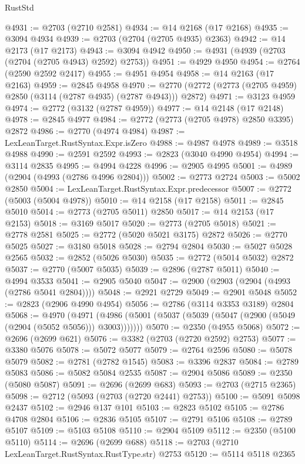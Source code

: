 \begin{lexlean}{RustStd}
\begin{coremodule}
@4931 := @2703 (@2710 @2581)
@4934 := @14 @2168 (@17 @2168)
@4935 := @3094 @4934
@4939 := @2703 (@2704 (@2705 @4935) @2363)
@4942 := @14 @2173 (@17 @2173)
@4943 := @3094 @4942
@4950 := @4931 (@4939 (@2703 (@2704 (@2705 @4943) @2592) @2753))
@4951 := @4929 @4950
@4954 := @2764 (@2590 @2592 @2417)
@4955 := @4951 @4954
@4958 := @14 @2163 (@17 @2163)
@4959 := @2845 @4958
@4970 := @2770 (@2772 (@2773 (@2705 @4959) @2850 (@3114 (@2787 @4935) (@2787 @4943))) @2872)
@4971 := @3123 @4959
@4974 := @2772 (@3132 (@2787 @4959))
@4977 := @14 @2148 (@17 @2148)
@4978 := @2845 @4977
@4984 := @2772 (@2773 (@2705 @4978) @2850 @3395) @2872
@4986 := @2770 (@4974 @4984)
@4987 := LexLeanTarget.RustSyntax.Expr.isZero
@4988 := @4987 @4978
@4989 := @3518 @4988
@4990 := @2591 @2592
@4993 := @2823 (@3040 @4990 @4954)
@4994 := @3114 @2835
@4995 := @4994 @4228
@4996 := @2905 @4995
@5001 := @4989 (@2904 (@4993 (@2786 @4996 @2804)))
@5002 := @2773 @2724
@5003 := @5002 @2850
@5004 := LexLeanTarget.RustSyntax.Expr.predecessor
@5007 := @2772 (@5003 (@5004 @4978))
@5010 := @14 @2158 (@17 @2158)
@5011 := @2845 @5010
@5014 := @2773 (@2705 @5011) @2850
@5017 := @14 @2153 (@17 @2153)
@5018 := @3169 @5017
@5020 := @2773 (@2705 @5018)
@5021 := @2778 @2581
@5025 := @2772 (@5020 @5021 @3175) @2872
@5026 := @2770 @5025
@5027 := @3180 @5018
@5028 := @2794 @2804
@5030 := @5027 @5028 @2565
@5032 := @2852 (@5026 @5030)
@5035 := @2772 (@5014 @5032) @2872
@5037 := @2770 (@5007 @5035)
@5039 := @2896 (@2787 @5011)
@5040 := @4994 @3533
@5041 := @2905 @5040
@5047 := @2900 (@2903 (@2904 (@4993 (@2786 @5041 @2804))))
@5048 := @2921 @2729
@5049 := @2901 @5048
@5052 := @2823 (@2906 @4990 @4954)
@5056 := @2786 (@3114 @3353 @3189) @2804
@5068 := @4970
    (@4971 (@4986 (@5001 (@5037 (@5039 (@5047 (@2900 (@5049 (@2904 (@5052 @5056))) @3003)))))))
@5070 := @2350 (@4955 @5068)
@5072 := @2696 (@2699 @621)
@5076 := @3382 (@2703 (@2720 @2592) @2753)
@5077 := @3380 @5076
@5078 := @5072 @5077
@5079 := @2764 @2596
@5080 := @5078 @5079
@5082 := @2781 (@2782 @1545)
@5083 := @3396 @2837
@5084 := @2789 @5083
@5086 := @5082 @5084 @2535
@5087 := @2904 @5086
@5089 := @2350 (@5080 @5087)
@5091 := @2696 (@2699 @683)
@5093 := @2703 (@2715 @2365)
@5098 := @2712 (@5093 (@2703 (@2720 @2441) @2753))
@5100 := @5091 @5098 @2437
@5102 := @2946 @137 @101
@5103 := @2823 @5102
@5105 := @2786 @4708 @2804
@5106 := @2836 @5105
@5107 := @2791 @5106
@5108 := @2789 @5107
@5109 := @5103 @5108
@5110 := @2904 @5109
@5112 := @2350 (@5100 @5110)
@5114 := @2696 (@2699 @688)
@5118 := @2703 (@2710 LexLeanTarget.RustSyntax.RustType.str) @2753
@5120 := @5114 @5118 @2365

\end{coremodule}
\end{lexlean}
